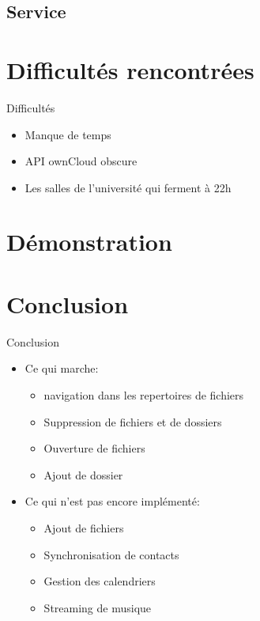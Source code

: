 \documentclass{beamer}
\begin{document}
	\subsection{Service}
		\begin{frame}{}
		\begin{itemize}

		\end{itemize}
		\end{frame}

		\begin{frame}{}
		\begin{itemize}

		\end{itemize}
		\end{frame}


	


\section{Difficultés rencontrées}
\begin{frame}{Difficultés}
	\begin{itemize}
	\item Manque de temps
	\item API ownCloud obscure
	\item Les salles de l'université qui ferment à 22h
	\end{itemize}
	\end{frame}


\section{Démonstration}

\section{Conclusion}
	\begin{frame}{Conclusion}
	\begin{itemize}
	\item Ce qui marche:
		\begin{itemize}
		\item navigation dans les repertoires de fichiers
		\item Suppression de fichiers et de dossiers
		\item Ouverture de fichiers
		\item Ajout de dossier 
		\end{itemize}
	\pause
	\item Ce qui n'est pas encore implémenté:
		\begin{itemize}
		\item Ajout de fichiers
		\item Synchronisation de contacts
		\item Gestion des calendriers
		\item Streaming de musique
		\end{itemize}
	\end{itemize}
	\end{frame}
\end{document}
